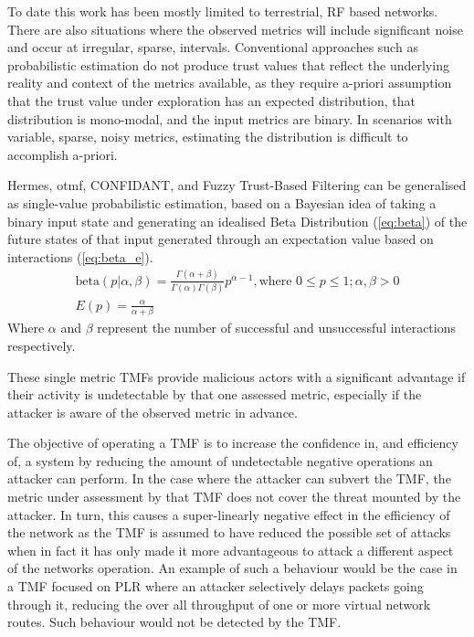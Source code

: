 To date this work has been mostly limited to terrestrial, RF based networks.
There are also situations where the observed metrics will include significant noise and occur at irregular, sparse, intervals.
Conventional approaches such as probabilistic estimation do not produce trust values that reflect the underlying reality and context of the metrics available, as they require a-priori assumption that the trust value under exploration has an expected distribution, that distribution is mono-modal, and the input metrics are binary.
In scenarios with variable, sparse, noisy metrics, estimating the distribution is difficult to accomplish a-priori.

Hermes, \gls{otmf}, CONFIDANT, and Fuzzy Trust-Based Filtering can be generalised as single-value probabilistic estimation, based on a Bayesian idea of taking a binary input state and generating an idealised Beta Distribution (\ref{eq:beta}) of the future states of that input generated through an expectation value based on interactions (\ref{eq:beta_e}).
%
\begin{align}
  \label{eq:beta}
  \text{beta}(p|\alpha,\beta) = \frac{\Gamma(\alpha + \beta)}{\Gamma(\alpha)\Gamma(\beta)}p^{\alpha-1},\text{where } 0 \leq p \leq 1; \alpha,\beta > 0\\
  \label{eq:beta_e}
  E(p) = \frac{\alpha}{\alpha + \beta}
\end{align}
%
Where $\alpha$ and $\beta$ represent the number of successful and unsuccessful interactions respectively.

These single metric TMFs provide malicious actors with a significant advantage if their activity is undetectable by that one assessed metric, especially if the attacker is aware of the observed metric in advance.

The objective of operating a TMF is to increase the confidence in, and efficiency of, a system by reducing the amount of undetectable negative operations an attacker can perform.
In the case where the attacker can subvert the TMF, the metric under assessment by that TMF does not cover the threat mounted by the attacker.
In turn, this causes a super-linearly negative effect in the efficiency of the network as the TMF is assumed to have reduced the possible set of attacks when in fact it has only made it more advantageous to attack a different aspect of the networks operation.
An example of such a behaviour would be the case in a TMF focused on PLR where an attacker selectively delays packets going through it, reducing the over all throughput of one or more virtual network routes.
Such behaviour would not be detected by the TMF.


